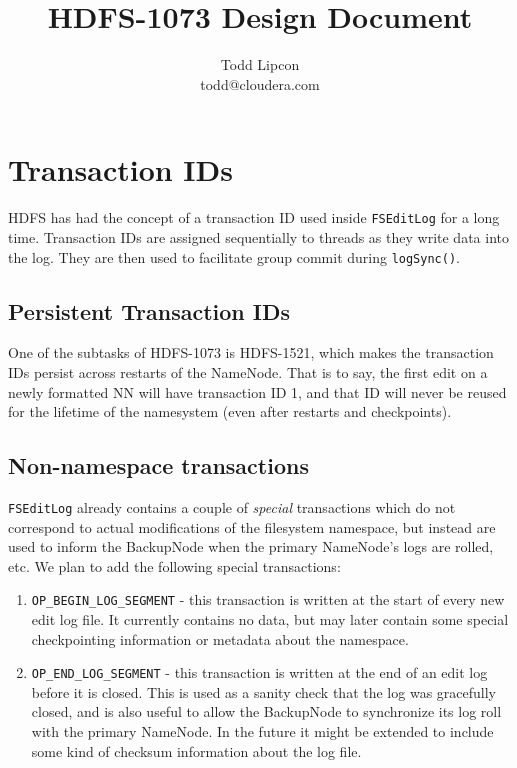 \documentclass{article}
\title{HDFS-1073 Design Document}
\author{Todd Lipcon\\todd@cloudera.com}
\begin{document}
\maketitle
\tableofcontents

\section{Transaction IDs}

HDFS has had the concept of a transaction ID used inside {\tt FSEditLog} for a long time.
Transaction IDs are assigned sequentially to threads as they write data into the log. They
are then used to facilitate group commit during {\tt logSync()}.

\subsection{Persistent Transaction IDs}

One of the subtasks of HDFS-1073 is HDFS-1521, which makes the transaction IDs persist
across restarts of the NameNode. That is to say, the first edit on a newly formatted
NN will have transaction ID 1, and that ID will never be reused for the lifetime of
the namesystem (even after restarts and checkpoints).

\subsection{Non-namespace transactions}

{\tt FSEditLog} already contains a couple of {\em special} transactions which do not correspond
to actual modifications of the filesystem namespace, but instead are used to inform the
BackupNode when the primary NameNode's logs are rolled, etc. We plan to add the following
special transactions:

\begin{enumerate}
\item {\tt OP\_BEGIN\_LOG\_SEGMENT} - this transaction is written at the start of every new
edit log file. It currently contains no data, but may later contain some special checkpointing
information or metadata about the namespace.
\item {\tt OP\_END\_LOG\_SEGMENT} - this transaction is written at the end of an edit log
before it is closed. This is used as a sanity check that the log was gracefully closed, and
is also useful to allow the BackupNode to synchronize its log roll with the primary NameNode.
In the future it might be extended to include some kind of checksum information about the log
file.
\end{enumerate}
\end{document}
